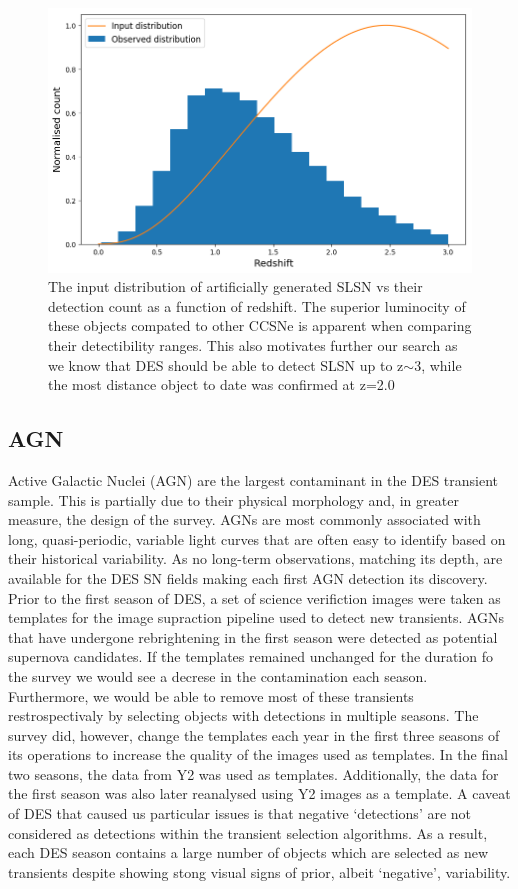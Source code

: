 \begin{figure}
  \includegraphics[width=\textwidth]{Figures/Chapter5/SLSN_z_dist.png}
  \caption{The input distribution of artificially generated SLSN vs their detection count as a function of redshift. The superior luminocity of these objects compated to other CCSNe is apparent when comparing their detectibility ranges. This also motivates further our search as we know that DES should be able to detect SLSN up to z$\sim$3, while the most distance object to date was confirmed at z=2.0}
  \label{fig:SLSNDist}
\end{figure}

\subsection{AGN}
Active Galactic Nuclei (AGN) are the largest contaminant in the DES transient sample. This is partially due to their physical morphology and, in greater measure, the design of the survey. AGNs are most commonly associated with long, quasi-periodic, variable light curves that are often easy to identify based on their historical variability. As no long-term observations, matching its depth, are available for the DES SN fields making each first AGN detection its discovery. Prior to the first season of DES, a set of science verifiction images were taken as templates for the image supraction pipeline used to detect new transients. AGNs that have undergone rebrightening in the first season were detected as potential supernova candidates. If the templates remained unchanged for the duration fo the survey we would see a decrese in the contamination each season. Furthermore, we would be able to remove most of these transients restrospectivaly by selecting objects with detections in multiple seasons. The survey did, however, change the templates each year in the first three seasons of its operations to increase the quality of the images used as templates. In the final two seasons, the data from Y2 was used as templates. Additionally, the data for the first season was also later reanalysed using Y2 images as a template. A caveat of DES that caused us particular issues is that negative `detections' are not considered as detections within the transient selection algorithms. As a result, each DES season contains a large number of objects which are selected as new transients despite showing stong visual signs of prior, albeit `negative', variability.

